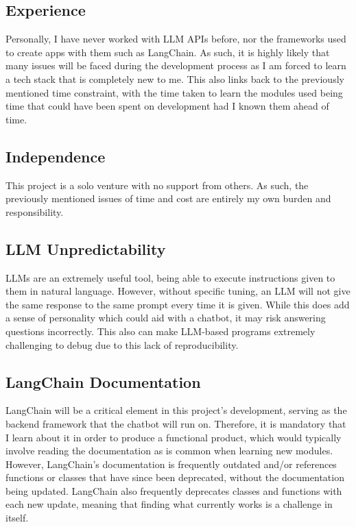 \subsection{Experience}
Personally, I have never worked with LLM APIs before, nor the frameworks used to create apps with them such as LangChain. As such,
it is highly likely that many issues will be faced during the development process as I am forced to learn a tech stack that is completely 
new to me. This also links back to the previously mentioned time constraint, with the time taken to learn the modules used being time that 
could have been spent on development had I known them ahead of time.

\subsection{Independence}
This project is a solo venture with no support from others. As such, the previously mentioned issues of time and cost are entirely 
my own burden and responsibility. 

\subsection{LLM Unpredictability}
LLMs are an extremely useful tool, being able to execute instructions given to them in natural language. However, without specific tuning, 
an LLM will not give the same response to the same prompt every time it is given. While this does add a sense of personality which could 
aid with a chatbot, it may risk answering questions incorrectly. This also can make LLM-based programs extremely challenging to debug due 
to this lack of reproducibility.

\subsection{LangChain Documentation}
LangChain will be a critical element in this project's development, serving as the backend framework that the chatbot will run on.
Therefore, it is mandatory that I learn about it in order to produce a functional product, which would typically involve reading the 
documentation as is common when learning new modules. However, LangChain's documentation is frequently outdated and/or references 
functions or classes that have since been deprecated, without the documentation being updated. LangChain also frequently deprecates classes 
and functions with each new update, meaning that finding what currently works is a challenge in itself.


